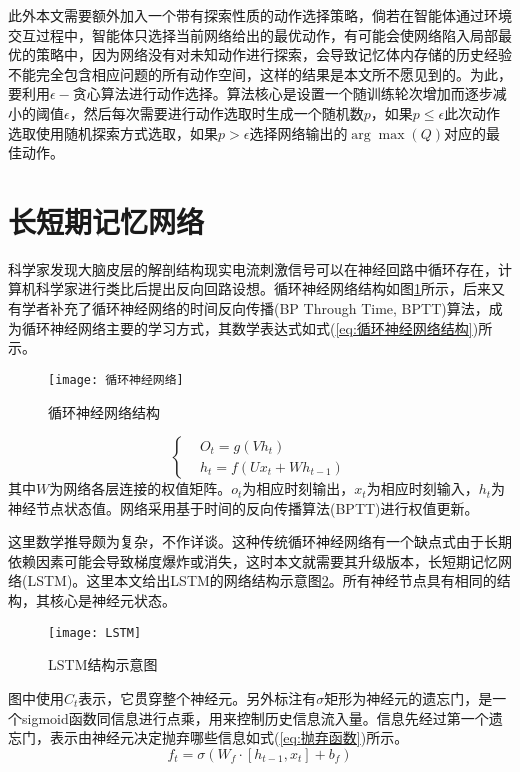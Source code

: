 此外本文需要额外加入一个带有探索性质的动作选择策略，倘若在智能体通过环境交互过程中，智能体只选择当前网络给出的最优动作，有可能会使网络陷入局部最优的策略中，因为网络没有对未知动作进行探索，会导致记忆体内存储的历史经验不能完全包含相应问题的所有动作空间，这样的结果是本文所不愿见到的。为此，要利用$\epsilon-$贪心算法进行动作选择。算法核心是设置一个随训练轮次增加而逐步减小的阈值$\epsilon$，然后每次需要进行动作选取时生成一个随机数$p$，如果$p\leqslant \epsilon$此次动作选取使用随机探索方式选取，如果$p> \epsilon$选择网络输出的$\arg \max \left ( Q \right )$对应的最佳动作。

\section{长短期记忆网络}
科学家发现大脑皮层的解剖结构现实电流刺激信号可以在神经回路中循环存在，计算机科学家进行类比后提出反向回路设想。循环神经网络结构如图\ref{fig:循环神经网络}所示，后来又有学者补充了循环神经网络的时间反向传播(BP Through Time, BPTT)算法，成为循环神经网络主要的学习方式，其数学表达式如式(\ref{eq:循环神经网络结构})所示。
\begin{figure}[h]
	\centering
	\texttt{[image: 循环神经网络]}
	\caption{循环神经网络结构}
	\label{fig:循环神经网络}
\end{figure}
\begin{equation}\label{eq:循环神经网络结构}
\left\lbrace 
\begin{aligned}
&O_{t}=g\left ( Vh_{t} \right )\\
&h_{t}=f\left ( Ux_{t} + Wh_{t-1} \right )
\end{aligned}
\right.
\end{equation}
其中$W$为网络各层连接的权值矩阵。$o_{t}$为相应时刻输出，$x_{t}$为相应时刻输入，$h_{t}$为神经节点状态值。网络采用基于时间的反向传播算法(BPTT)进行权值更新。

这里数学推导颇为复杂，不作详谈。这种传统循环神经网络有一个缺点式由于长期依赖因素可能会导致梯度爆炸或消失，这时本文就需要其升级版本，长短期记忆网络(LSTM)。这里本文给出LSTM的网络结构示意图\ref{fig:LSTM示意图}。所有神经节点具有相同的结构，其核心是神经元状态。
\begin{figure}[h]
	\centering
	\texttt{[image: LSTM]}
	\caption{LSTM结构示意图}
	\label{fig:LSTM示意图}
\end{figure}

图中使用$C_{t}$表示，它贯穿整个神经元。另外标注有$\sigma$矩形为神经元的遗忘门，是一个sigmoid函数同信息进行点乘，用来控制历史信息流入量。信息先经过第一个遗忘门，表示由神经元决定抛弃哪些信息如式(\ref{eq:抛弃函数})所示。
\begin{equation}\label{eq:抛弃函数}
f_{t}=\sigma\left ( W_{f} \cdot \left [ h_{t-1},x_{t} \right ]+b_{f}\right )
\end{equation}


